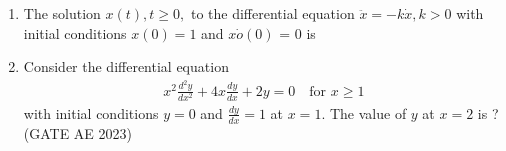 \begin{enumerate}[label=\thechapter.\arabic*,ref=\thechapter.\theenumi]
\newpage
\item The solution $ x(t) ,t \geq 0, $ to the differential equation
$ \ddot{x} = -k\dot{x}  , k > 0 $ with initial conditions $ x(0) = 1 $ and $ x\dot{o}(0) $ = 0 is\\
\solution
\pagebreak
\item  Consider the differential equation
\begin{align}
x^2\frac{d^2y}{dx^2} + 4x\frac{dy}{dx} + 2y = 0 \quad \text{for } x\geq 1 \nonumber
\end{align}
with initial conditions $y=0$ and $\frac{dy}{dx} = 1$ at
$x = 1$. The value of $y$ at $x = 2$ is ?\\

\hfill(GATE AE 2023)
\solution
\pagebreak
\end{enumerate}
